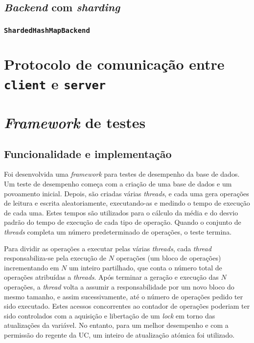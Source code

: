 \documentclass[12pt, a4paper, titlepage]{article}
\begin{document}
\subsection{\emph{Backend} com \emph{sharding}}

\subsubsection{\texttt{ShardedHashMapBackend}}

\section{Protocolo de comunicação entre \texttt{client} e \texttt{server}}

\pagebreak %
\section{\emph{Framework} de testes}

\subsection{Funcionalidade e implementação}

Foi desenvolvida uma \emph{framework} para testes de desempenho da base de dados. Um teste de
desempenho começa com a criação de uma base de dados e um povoamento inicial. Depois, são criadas
várias \emph{threads}, e cada uma gera operações de leitura e escrita aleatoriamente, executando-as
e medindo o tempo de execução de cada uma. Estes tempos são utilizados para o cálculo da média e do
desvio padrão do tempo de execução de cada tipo de operação. Quando o conjunto de \emph{threads}
completa um número predeterminado de operações, o teste termina.

Para dividir as operações a executar pelas várias \emph{threads}, cada \emph{thread}
responsabiliza-se pela execução de $N$ operações (um bloco de operações) incrementando em $N$ um
inteiro partilhado, que conta o número total de operações atribuídas a \emph{threads}. Após terminar
a geração e execução das $N$ operações, a \emph{thread} volta a assumir a responsabilidade por um
novo bloco do mesmo tamanho, e assim sucessivamente, até o número de operações pedido ter sido
executado. Estes acessos concorrentes ao contador de operações poderiam ter sido controlados com a
aquisição e libertação de um \emph{lock} em torno das atualizações da variável. No entanto, para um
melhor desempenho e com a permissão do regente da UC, um inteiro de atualização atómica foi
utilizado.
\end{document}
